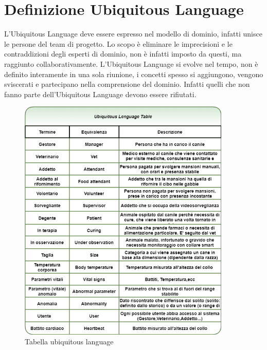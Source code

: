 	\section{Definizione Ubiquitous Language}	
	L'Ubiquitous Language deve essere espresso nel modello di dominio, infatti unisce le persone del team di progetto.
    Lo scopo è eliminare le imprecisioni e le contraddizioni degli esperti di dominio, non è infatti imposto da questi, ma raggiunto collaborativamente.
    L'Ubiquitous Language si evolve nel tempo, non è definito interamente in una sola riunione, i concetti spesso si aggiungono, vengono sviscerati e partecipano nella comprensione del dominio. Infatti quelli che non fanno parte dell'Ubiquitous Language devono essere rifiutati.
    
    \begin{figure}[ht]
        \caption{Tabella ubiquitous language}
        \centering
        \includegraphics[width=0.9\textwidth]{DrawIo/ubiquitousLanguage.png}
    \end{figure}
        
